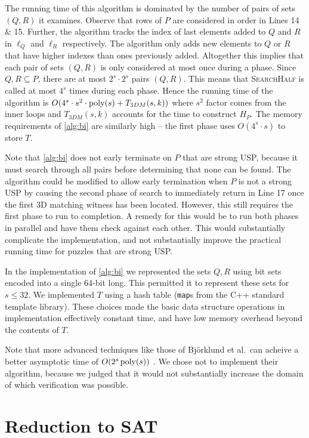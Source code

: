 \documentclass[11pt]{article}
\newcommand\sse{\subseteq}
\begin{document}
The running time of this algorithm is dominated by the number of pairs
of sets $(Q,R)$ it examines.  Observe that rows of $P$ are considered
in order in Lines 14 \& 15.  Further, the algorithm tracks the index
of last elements added to $Q$ and $R$ in $\ell_Q$ and $\ell_R$
respectively.  The algorithm only adds new elements to $Q$ or $R$ that
have higher indexes than ones previously added.  Altogether this
implies that each pair of sets $(Q,R)$ is only considered at most once
during a phase.  Since $Q, R \sse P$, there are at most $2^s \cdot
2^s$ pairs $(Q,R)$.  This means that \textsc{SearchHalf} is called at
most $4^s$ times during each phase.  Hence the running time of the
algorithm is $O(4^s \cdot s^2 \cdot \operatorname{poly}(s) + T_{3DM}(s,k))$ where
$s^2$ factor comes from the inner loops and $T_{3DM}(s,k)$ accounts
for the time to construct $H_P$.  The memory requirements of
\autoref{alg:bi} are similarly high -- the first phase uses $O(4^s
\cdot s)$ to store $T$.

Note that \autoref{alg:bi} does not early terminate on $P$ that are
strong USP, because it must search through all pairs before
determining that none can be found.  The algorithm could be modified
to allow early termination when $P$ is not a strong USP by causing the
second phase of search to immediately return in Line 17 once the first
3D matching witness has been located.  However, this still requires
the first phase to run to completion.  A remedy for this would be to
run both phases in parallel and have them check against each other.
This would substantially complicate the implementation, and not
substantially improve the practical running time for puzzles that are
strong USP.

In the implementation of \autoref{alg:bi} we represented the sets
$Q,R$ using bit sets encoded into a single 64-bit long.  This
permitted it to represent these sets for $s \le 32$.  We implemented
$T$ using a hash table (\texttt{map}s from the C++ standard template
library).  These choices made the basic data structure operations in
implementation effectively constant time, and have low memory overhead
beyond the contents of $T$.

Note that more advanced techniques like those of Bj\"{o}rklund et
al.~can acheive a better asymptotic time of $O(2^s\operatorname{poly}(s))$
\cite{bhkk17}.  We chose not to implement their algorithm, because we
judged that it would not substantially increase the domain of which
verification was possible.  

\section{Reduction to SAT}
\end{document}
